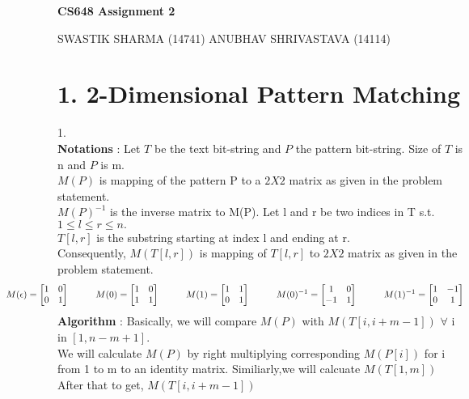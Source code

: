 \documentclass{article}
\begin{document}
\begin{center}
\huge{\textbf{CS648 Assignment 2}}\\
\end{center}
SWASTIK SHARMA (14741)
\hfill
ANUBHAV SHRIVASTAVA (14114)

\section*{1. 2-Dimensional Pattern Matching}
1. \\
\textbf{Notations} :
Let $T$ be the text bit-string and $P$ the pattern bit-string. Size of $T$ is n and $P$ is m. \\
$M(P)$ is mapping of the pattern P to a $2 X 2$ matrix as given in the problem statement. \\
$M(P)^{-1}$ is the inverse matrix to M(P).
Let l and r be two indices in T s.t. $1 \leq l \leq r \leq n.$ \\
$T[l,r]$ is the substring starting at index l and ending at r. \\
Consequently, $M(T[l,r])$ is mapping of $T[l,r]$ to $2 X 2$ matrix as given in the problem statement. \\
\[
\hspace{-2cm}
M(\epsilon)=
	\begin{bmatrix}
	1 & 0 \\
	0 & 1 
	\end{bmatrix}
\hspace{1cm}
M(0)=
	\begin{bmatrix}
	1 & 0 \\
	1 & 1 
	\end{bmatrix}
\hspace{1cm}
M(1)=
	\begin{bmatrix}
	1 & 1 \\
	0 & 1 
	\end{bmatrix}
\hspace{1cm}
M(0)^{-1}=
	\begin{bmatrix}
	1 & 0 \\
	-1 & 1
	\end{bmatrix}
\hspace{1cm}
M(1)^{-1}=
	\begin{bmatrix}
	1 & -1 \\
	0 & 1 
	\end{bmatrix}
\]
\textbf{Algorithm} :
Basically, we will compare $M(P)$ with $M(T[i,i+m-1])$ $\forall$ i in $[1,n-m+1]$.\\
We will calculate $M(P)$ by right multiplying corresponding $M(P[i])$ for i from 1 to m to an identity matrix. Similiarly,we will calcuate $M(T[1,m])$ After that to get, $M(T[i,i+m-1])$
\end{document}
